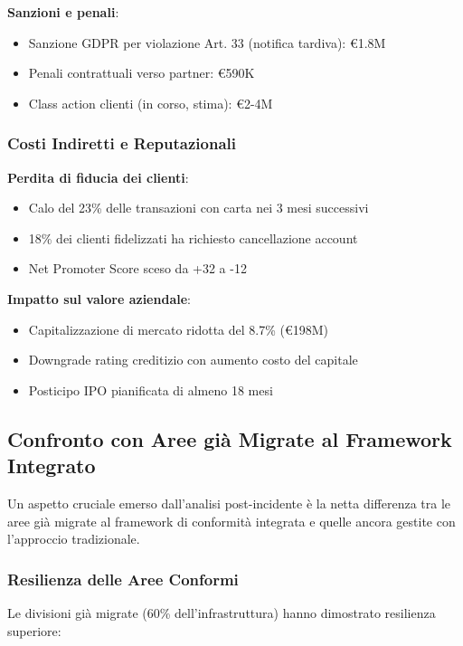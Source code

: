 \textbf{Sanzioni e penali}:
\begin{itemize}
    \item Sanzione GDPR per violazione Art. 33 (notifica tardiva): €1.8M
    \item Penali contrattuali verso partner: €590K
    \item Class action clienti (in corso, stima): €2-4M
\end{itemize}

\subsubsection{Costi Indiretti e Reputazionali}

\textbf{Perdita di fiducia dei clienti}:
\begin{itemize}
    \item Calo del 23\% delle transazioni con carta nei 3 mesi successivi
    \item 18\% dei clienti fidelizzati ha richiesto cancellazione account
    \item Net Promoter Score sceso da +32 a -12
\end{itemize}

\textbf{Impatto sul valore aziendale}:
\begin{itemize}
    \item Capitalizzazione di mercato ridotta del 8.7\% (€198M)
    \item Downgrade rating creditizio con aumento costo del capitale
    \item Posticipo IPO pianificata di almeno 18 mesi
\end{itemize}

\subsection{Confronto con Aree già Migrate al Framework Integrato}
\label{subsec:4.8.3_confronto}

Un aspetto cruciale emerso dall'analisi post-incidente è la netta differenza tra le aree già migrate al framework di conformità integrata e quelle ancora gestite con l'approccio tradizionale.

\subsubsection{Resilienza delle Aree Conformi}

Le divisioni già migrate (60\% dell'infrastruttura) hanno dimostrato resilienza superiore:

